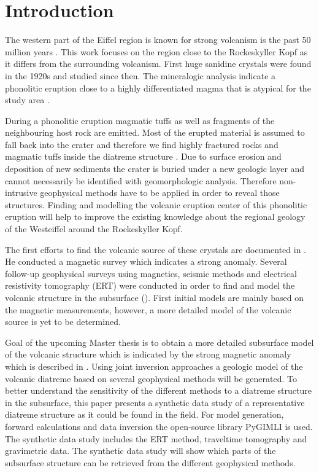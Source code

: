 \section{Introduction}\label{section:Introduction}
The western part of the Eiffel region is known for strong volcanism is the past 50 million years \citep{NiklasPlumpe.2015}. This work focuses on the region close to the Rockeskyller Kopf as it differs from the surrounding volcanism. First huge sanidine crystals were found in the 1920s \citep{hopmann1914spuren} and studied since then. The mineralogic analysis indicate a phonolitic eruption close to a highly differentiated magma that is atypical for the study area \citep{MarcBoxberg.2011}. 

During a phonolitic eruption magmatic tuffs as well as fragments of the neighbouring host rock are emitted. Most of the erupted material is assumed to fall back into the crater and therefore we find highly fractured rocks and magmatic tuffs inside the diatreme structure \citep{white2011maar}. Due to surface erosion and deposition of new sediments the crater is buried under a new geologic layer and cannot necessarily be identified with geomorphologic analysis. Therefore non-intrusive geophysical methods have to be applied in order to reveal those structures. Finding and modelling the volcanic eruption center of this phonolitic eruption will help to improve the existing knowledge about the regional geology of the Westeiffel around the Rockeskyller Kopf. 

The first efforts to find the volcanic source of these crystals are documented in \citet{mertes1983aufbau}. He conducted a magnetic survey which indicates a strong anomaly. Several follow-up geophysical surveys using magnetics, seismic methods and electrical resistivity tomography (ERT) were conducted in order to find and model the volcanic structure in the subsurface (\cite{MarcBoxberg.2011,NiklasPlumpe.2015,NadineHauburg.2016,DanielSchneider.2017,TimGilberti.2020,HannahMues.2013}). First initial models are mainly based on the magnetic measurements, however, a more detailed model of the volcanic source is yet to be determined. 

Goal of the upcoming Master thesis is to obtain a more detailed subsurface model of the volcanic structure which is indicated by the strong magnetic anomaly which is described in \citet{mertes1983aufbau,MarcBoxberg.2011}. Using joint inversion approaches a geologic model of the volcanic diatreme based on several geophysical methods will be generated. To better understand the sensitivity of the different methods to a diatreme structure in the subsurface, this paper presents a synthetic data study of a representative diatreme structure as it could be found in the field. For model generation, forward calculations and data inversion the open-source library PyGIMLI \citep{Ruecker2017} is used. The synthetic data study includes the ERT method, traveltime tomography and gravimetric data. The synthetic data study will show which parts of the subsurface structure can be retrieved from the different geophysical methods.

